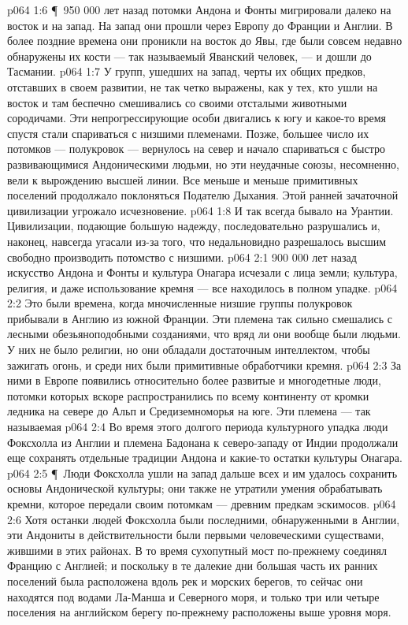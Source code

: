 \vs p064 1:6 \P\ 950 000 лет назад потомки Андона и Фонты мигрировали далеко на восток и на запад. На запад они прошли через Европу до Франции и Англии. В более поздние времена они проникли на восток до Явы, где были совсем недавно обнаружены их кости --- так называемый Яванский человек, --- и дошли до Тасмании.
\vs p064 1:7 У групп, ушедших на запад, черты их общих предков, отставших в своем развитии, не так четко выражены, как у тех, кто ушли на восток и там беспечно смешивались со своими отсталыми животными сородичами. Эти непрогрессирующие особи двигались к югу и какое\hyp{}то время спустя стали спариваться с низшими племенами. Позже, большее число их потомков --- полукровок --- вернулось на север и начало спариваться с быстро развивающимися Андоническими людьми, но эти неудачные союзы, несомненно, вели к вырождению высшей линии. Все меньше и меньше примитивных поселений продолжало поклоняться Подателю Дыхания. Этой ранней зачаточной цивилизации угрожало исчезновение.
\vs p064 1:8 И так всегда бывало на Урантии. Цивилизации, подающие большую надежду, последовательно разрушались и, наконец, навсегда угасали из\hyp{}за того, что недальновидно разрешалось высшим свободно производить потомство с низшими.
\vs p064 2:1 900 000 лет назад искусство Андона и Фонты и культура Онагара исчезали с лица земли; культура, религия, и даже использование кремня --- все находилось в полном упадке.
\vs p064 2:2 Это были времена, когда мночисленные низшие группы полукровок прибывали в Англию из южной Франции. Эти племена так сильно смешались с лесными обезьяноподобными созданиями, что вряд ли они вообще были людьми. У них не было религии, но они обладали достаточным интеллектом, чтобы зажигать огонь, и среди них были примитивные обработчики кремня.
\vs p064 2:3 За ними в Европе появились относительно более развитые и многодетные люди, потомки которых вскоре распространились по всему континенту от кромки ледника на севере до Альп и Средиземноморья на юге. Эти племена --- так называемая 
\vs p064 2:4 Во время этого долгого периода культурного упадка люди Фоксхолла из Англии и племена Бадонана к северо\hyp{}западу от Индии продолжали еще сохранять отдельные традиции Андона и какие\hyp{}то остатки культуры Онагара.
\vs p064 2:5 \P\ Люди Фоксхолла ушли на запад дальше всех и им удалось сохранить основы Андонической культуры; они также не утратили умения обрабатывать кремни, которое передали своим потомкам --- древним предкам эскимосов.
\vs p064 2:6 Хотя останки людей Фоксхолла были последними, обнаруженными в Англии, эти Андониты в действительности были первыми человеческими существами, жившими в этих районах. В то время сухопутный мост по\hyp{}прежнему соединял Францию с Англией; и поскольку в те далекие дни большая часть их ранних поселений была расположена вдоль рек и морских берегов, то сейчас они находятся под водами Ла\hyp{}Манша и Северного моря, и только три или четыре поселения на английском берегу по\hyp{}прежнему расположены выше уровня моря.
